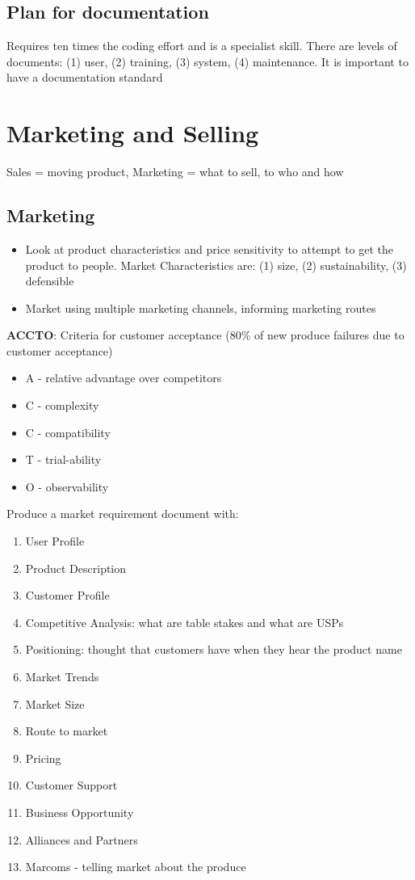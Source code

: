 \documentclass{article}
\begin{document}
\begin{multicols}{2}
\subsection{Plan for documentation}
Requires ten times the coding effort and is a specialist skill. There are levels of documents: (1) user, (2) training, (3) system, (4) maintenance. It is important to have a documentation standard

\section{Marketing and Selling}
Sales = moving product, Marketing = what to sell, to who and how

\subsection{Marketing}
\begin{itemize}
    \item Look at product characteristics and price sensitivity to attempt to get the product to people.
    \subitem Market Characteristics are: (1) size, (2) sustainability, (3) defensible
    \item Market using multiple marketing channels, informing marketing routes
\end{itemize}

\textbf{ACCTO}: Criteria for customer acceptance (80\% of new produce failures due to customer acceptance)
\begin{itemize}
    \item A - relative advantage over competitors
    \item C - complexity
    \item C - compatibility
    \item T - trial-ability
    \item O - observability
\end{itemize}

Produce a market requirement document with:
\begin{enumerate}
    \item User Profile
    \item Product Description
    \item Customer Profile
    \item Competitive Analysis: what are table stakes and what are USPs
    \item Positioning: thought that customers have when they hear the product name
    \item Market Trends
    \item Market Size
    \item Route to market
    \item Pricing
    \item Customer Support
    \item Business Opportunity
    \item Alliances and Partners
    \item Marcoms - telling market about the produce
\end{enumerate}


\end{multicols}
\end{document}
